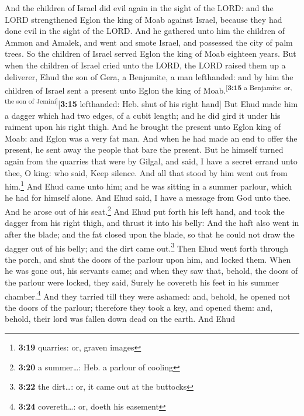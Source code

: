  And the children of Israel did evil again in the sight
of the LORD: and the LORD strengthened Eglon the king of Moab against
Israel, because they had done evil in the sight of the LORD.
 And he gathered unto him the children of Ammon and
Amalek, and went and smote Israel, and possessed the city of palm trees.
 So the children of Israel served Eglon the king of Moab
eighteen years.  But when the children of Israel cried
unto the LORD, the LORD raised them up a deliverer, Ehud the son of
Gera, a Benjamite, a man lefthanded: and by him the children of Israel
sent a present unto Eglon the king of
Moab.\textsuperscript{{[}\textbf{3:15} a Benjamite: or, the son of
Jemini{]}}{[}\textbf{3:15} lefthanded: Heb. shut of his right hand{]}
 But Ehud made him a dagger which had two edges, of a
cubit length; and he did gird it under his raiment upon his right thigh.
 And he brought the present unto Eglon king of Moab: and
Eglon was a very fat man.  And when he had made an end to
offer the present, he sent away the people that bare the present.
 But he himself turned again from the quarries that were
by Gilgal, and said, I have a secret errand unto thee, O king: who said,
Keep silence. And all that stood by him went out from him.\footnote{\textbf{3:19}
  quarries: or, graven images}  And Ehud came unto him;
and he was sitting in a summer parlour, which he had for himself alone.
And Ehud said, I have a message from God unto thee. And he arose out of
his seat.\footnote{\textbf{3:20} a summer\ldots: Heb. a parlour of
  cooling}  And Ehud put forth his left hand, and took
the dagger from his right thigh, and thrust it into his belly:
 And the haft also went in after the blade; and the fat
closed upon the blade, so that he could not draw the dagger out of his
belly; and the dirt came out.\footnote{\textbf{3:22} the dirt\ldots: or,
  it came out at the buttocks}  Then Ehud went forth
through the porch, and shut the doors of the parlour upon him, and
locked them.  When he was gone out, his servants came;
and when they saw that, behold, the doors of the parlour were locked,
they said, Surely he covereth his feet in his summer chamber.\footnote{\textbf{3:24}
  covereth\ldots: or, doeth his easement}  And they
tarried till they were ashamed: and, behold, he opened not the doors of
the parlour; therefore they took a key, and opened them: and, behold,
their lord was fallen down dead on the earth.  And Ehud

